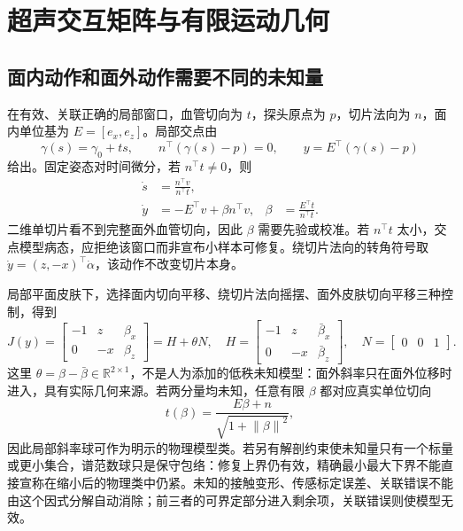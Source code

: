 \documentclass[11pt,a4paper]{article}
\numberwithin{equation}{section}
\theoremstyle{definition}
\newcommand{\R}{\mathbb R}
\newcommand{\norm}[1]{\left\lVert#1\right\rVert}
\begin{document}
\section{超声交互矩阵与有限运动几何}\label{sec:rev:ultrasound}
\subsection{面内动作和面外动作需要不同的未知量}
在有效、关联正确的局部窗口，血管切向为 $t$，探头原点为 $p$，切片法向为 $n$，面内单位基为 $E=[e_x,e_z]$。局部交点由
\begin{equation}
 \gamma(s)=\gamma_0+ts,\qquad
 n^\top(\gamma(s)-p)=0,\qquad
 y=E^\top(\gamma(s)-p)
\end{equation}
给出。固定姿态对时间微分，若 $n^\top t\ne0$，则
\begin{align}
 \dot s&=\frac{n^\top v}{n^\top t},\\
 \dot y&=-E^\top v+\beta n^\top v,
 &\beta&=\frac{E^\top t}{n^\top t}.
\end{align}
二维单切片看不到完整面外血管切向，因此 $\beta$ 需要先验或校准。若 $n^\top t$ 太小，交点模型病态，应拒绝该窗口而非宣布小样本可修复。绕切片法向的转角符号取 $\dot y=(z,-x)^\top\dot\alpha$，该动作不改变切片本身。

局部平面皮肤下，选择面内切向平移、绕切片法向摇摆、面外皮肤切向平移三种控制，得到
\begin{equation}
 J(y)=
 \begin{bmatrix}-1&z&\beta_x\\0&-x&\beta_z\end{bmatrix}
 =H+\theta N,\quad
 H=\begin{bmatrix}-1&z&\bar\beta_x\\0&-x&\bar\beta_z\end{bmatrix},\quad
 N=\begin{bmatrix}0&0&1\end{bmatrix}.
\end{equation}
这里 $\theta=\beta-\bar\beta\in\R^{2\times1}$，不是人为添加的低秩未知模型：面外斜率只在面外位移时进入，具有实际几何来源。若两分量均未知，任意有限 $\beta$ 都对应真实单位切向
\begin{equation}
 t(\beta)=\frac{E\beta+n}{\sqrt{1+\norm{\beta}^2}},
\end{equation}
因此局部斜率球可作为明示的物理模型类。若另有解剖约束使未知量只有一个标量或更小集合，谱范数球只是保守包络：修复上界仍有效，精确最小最大下界不能直接宣称在缩小后的物理类中仍紧。未知的接触变形、传感标定误差、关联错误不能由这个因式分解自动消除；前三者的可界定部分进入剩余项，关联错误则使模型无效。
\end{document}
